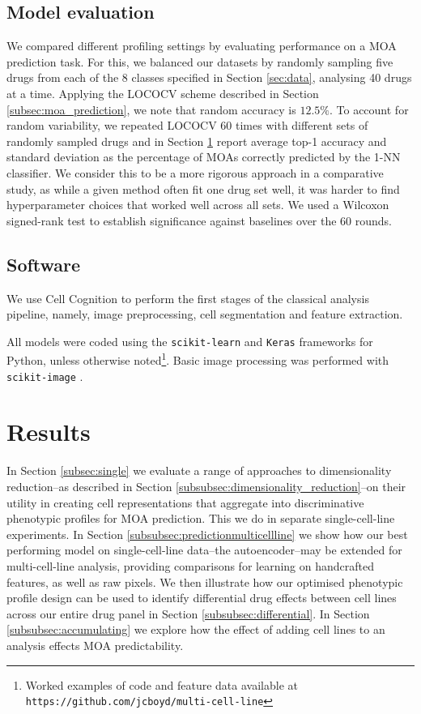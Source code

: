 \subsection{Model evaluation}

We compared different profiling settings by evaluating performance on a MOA prediction task. For this, we balanced our datasets by randomly sampling five drugs from each of the 8 classes specified in Section \ref{sec:data}, analysing 40 drugs at a time. Applying the LOCOCV scheme described in Section \ref{subsec:moa_prediction}, we note that random accuracy is $12.5\%$. To account for random variability, we repeated LOCOCV 60 times with different sets of randomly sampled drugs and in Section \ref{sec:results} report average top-1 accuracy and standard deviation as the percentage of MOAs correctly predicted by the 1-NN classifier. We consider this to be a more rigorous approach in a comparative study, as while a given method often fit one drug set well, it was harder to find hyperparameter choices that worked well across all sets. We used a Wilcoxon signed-rank test to establish significance against baselines over the 60 rounds.

\subsection{Software}

We use Cell Cognition \cite{held2010cellcognition} to perform the first stages of the classical analysis pipeline, namely, image preprocessing, cell segmentation and feature extraction.

All models were coded using the \texttt{scikit-learn} \cite{scikit-learn} and \texttt{Keras} \cite{chollet2015keras} frameworks for Python, unless otherwise noted\footnote{Worked examples of code and feature data available at \texttt{https://github.com/jcboyd/multi-cell-line}}. Basic image processing was performed with \texttt{scikit-image} \cite{VanderWalt2014}. 

\section{Results}
\label{sec:results}

In Section \ref{subsec:single} we evaluate a range of approaches to dimensionality reduction--as described in Section \ref{subsubsec:dimensionality_reduction}--on their utility in creating cell representations that aggregate into discriminative phenotypic profiles for MOA prediction. This we do in separate single-cell-line experiments. In Section \ref{subsubsec:predictionmulticellline} we show how our best performing model on single-cell-line data--the autoencoder--may be extended for multi-cell-line analysis, providing comparisons for learning on handcrafted features, as well as raw pixels. We then illustrate how our optimised phenotypic profile design can be used to identify differential drug effects between cell lines across our entire drug panel in Section \ref{subsubsec:differential}. In Section \ref{subsubsec:accumulating} we explore how the effect of adding cell lines to an analysis effects MOA predictability.


